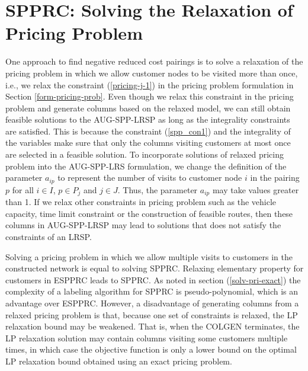 \section {SPPRC: Solving the Relaxation of Pricing Problem}
One approach to find negative reduced cost pairings is to solve a relaxation of 
the pricing problem in which we allow customer nodes to be visited more than once,
i.e., we relax the constraint (\ref{pricing-j-1}) in the pricing problem formulation 
in Section \ref{form-pricing-prob}. Even though we relax this constraint in the pricing
problem and generate columns based on the relaxed model, we can still obtain
feasible solutions to the AUG-SPP-LRSP as long as the integrality constraints are 
satisfied. This is because the constraint (\ref{spp_con1}) and the integrality of
the variables make sure that only the columns visiting customers at most once
are selected in a feasible solution. To incorporate solutions of relaxed pricing
problem into the AUG-SPP-LRS formulation, we change the definition of the parameter 
$a_{ip}$ to represent the number of visits to customer node $i$ in the pairing $p$ 
for all $i \in I$, $p \in P_j$ and $j \in J$. Thus, the parameter $a_{ip}$ may 
take values greater than 1. If we relax other constraints in pricing problem such 
as the vehicle capacity, time limit constraint or the construction of feasible 
routes, then these columns in AUG-SPP-LRSP may lead to solutions that does not 
satisfy the constraints of an LRSP. 

Solving a pricing problem in which we allow multiple visits to customers
in the constructed network is equal to solving SPPRC. Relaxing elementary property 
for customers in ESPPRC leads to SPPRC. As noted in section (\ref{solv-pri-exact})
the complexity of a labeling algorithm for SPPRC is pseudo-polynomial, which is an
advantage over ESPPRC.  However, a disadvantage of generating columns from a
relaxed pricing problem is that, because one  set of constraints is relaxed, 
the LP relaxation bound may be weakened. That is, when the COLGEN terminates, the 
LP relaxation solution may contain columns visiting some customers multiple times, 
in which case the objective function is only a lower bound on the optimal LP 
relaxation bound obtained using an exact pricing problem. 

